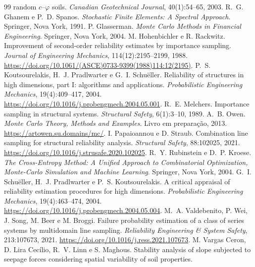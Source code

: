 \documentclass[11pt,a4paper]{article}
\begin{document}
\begin{thebibliography}{99}
  random $c$--$\varphi$ soils. \emph{Canadian Geotechnical Journal}, 40(1):54--65, 2003.
 R.~G. Ghanem e P.~D. Spanos. \emph{Stochastic Finite Elements: A Spectral
  Approach}. Springer, Nova York, 1991.
 P. Glasserman. \emph{Monte Carlo Methods in Financial Engineering}.
  Springer, Nova York, 2004.
 M. Hohenbichler e R. Rackwitz. Improvement of second-order
  reliability estimates by importance sampling. \emph{Journal of Engineering Mechanics}, 114(12):2195--2199, 1988.
  \url{https://doi.org/10.1061/(ASCE)0733-9399(1988)114:12(2195)}.
 P.~S. Koutsourelakis, H.~J. Pradlwarter e G.~I. Schuëller.
  Reliability of structures in high dimensions, part I: algorithms and applications. \emph{Probabilistic Engineering
  Mechanics}, 19(4):409--417, 2004. \url{https://doi.org/10.1016/j.probengmech.2004.05.001}.
 R.~E. Melchers. Importance sampling in structural systems. \emph{Structural
  Safety}, 6(1):3--10, 1989.
 A.~B. Owen. \emph{Monte Carlo Theory, Methods and Examples}. Livro em preparação, 2013.
  \url{https://artowen.su.domains/mc/}.
 I. Papaioannou e D. Straub. Combination line sampling for
  structural reliability analysis. \emph{Structural Safety}, 88:102025, 2021.
  \url{https://doi.org/10.1016/j.strusafe.2020.102025}.
 R.~Y. Rubinstein e D.~P. Kroese. \emph{The Cross-Entropy Method: A
  Unified Approach to Combinatorial Optimization, Monte-Carlo Simulation and Machine Learning}. Springer, Nova York,
  2004.
 G.~I. Schuëller, H.~J. Pradlwarter e P.~S. Koutsourelakis. A critical
  appraisal of reliability estimation procedures for high dimensions. \emph{Probabilistic Engineering Mechanics},
  19(4):463--474, 2004. \url{https://doi.org/10.1016/j.probengmech.2004.05.004}.
 M.~A. Valdebenito, P. Wei, J. Song, M. Beer e M. Broggi. Failure
  probability estimation of a class of series systems by multidomain line sampling. \emph{Reliability Engineering \&
  System Safety}, 213:107673, 2021. \url{https://doi.org/10.1016/j.ress.2021.107673}.
 M. Vargas Ceron, D. Lira Cecílio, R.~V. Linn e S. Maghous. Stability
  analysis of slope subjected to seepage forces considering spatial variability of soil properties.

\end{thebibliography}
\end{document}
